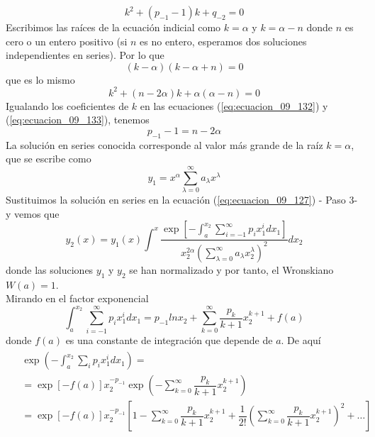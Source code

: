 \begin{equation}
k^{2} + (p_{-1} - 1) k + q_{-2} = 0
\label{eq:ecuacion_09_132}
\end{equation}
Escribimos las raíces de la ecuación indicial como $k = \alpha$ y $k= \alpha -n$ donde $n$ es cero o un entero positivo (si $n$ es no entero, esperamos dos soluciones independientes en series). Por lo que
\begin{equation}
(k - \alpha)(k - \alpha + n) = 0
\label{eq:ecuacion_09_133}
\end{equation}
que es lo mismo
\[ k^{2} + (n - 2 \alpha)k + \alpha(\alpha - n) = 0\]
Igualando los coeficientes de $k$ en las ecuaciones (\ref{eq:ecuacion_09_132}) y (\ref{eq:ecuacion_09_133}), tenemos
\begin{equation}
p_{-1} -1 = n - 2 \alpha
\label{eq:ecuacion_09_134}
\end{equation}
La solución en series conocida corresponde al valor más grande de la raíz $k=\alpha$, que se escribe como
\[ y_{1} =  x^{\alpha} \sum_{\lambda=0}^{\infty} a_{\lambda} x^{\lambda} \]
Sustituimos la solución en series en la ecuación (\ref{eq:ecuacion_09_127}) - Paso 3- y vemos que
\begin{equation}
y_{2}(x) = y_{1} (x) \int^{x} \dfrac{\exp \left[ - \int_{a}^{x_{2}} \sum_{i=-1}^{\infty} p_{i} x^{i}_{1} d x_{1} \right] }{x_{2}^{2\alpha} \left( \sum_{\lambda=0}^\infty a_{\lambda} x_{2}^{\lambda} \right)^{2} } dx_{2}
\label{eq:ecuacion_09_135}
\end{equation}
donde las soluciones $y_{1}$ y $y_{2}$ se han normalizado y por tanto, el Wronskiano $W(a)=1$. 
\\
Mirando en el factor exponencial
\begin{equation}
\int_{a}^{x_{2}} \sum_{i=-1}^{\infty} p_{i} x_{1}^{i} dx_{1} = p_{-1} ln x_{2} + \sum_{k=0}^{\infty} \dfrac{p_{k}}{k+1} x_{2}^{k+1} + f(a)
\label{eq:ecuacion_09_136}
\end{equation}
donde $f(a)$ es una constante de integración que depende de $a$. De aquí
\begin{eqnarray}
\begin{aligned}
&{}\exp \left( - \int_{a}^{x_{2}} \sum_{i} p_{i} x_{1}^{i} dx_{1} \right) =  \\
&= \exp [ - f(a) ] x_{2}^{-p_{-1}} \exp \left( - \sum_{k=0}^{\infty} \dfrac{p_{k}}{k+1} x_{2}^{k+1} \right)  \\
&= \exp [ - f(a) ] x_{2}^{-p_{-1}} \left[ 1 - \sum_{k=0}^{\infty} \dfrac{p_{k}}{k+1} x_{2}^{k+1} + \dfrac{1}{2!} \left( \sum_{k=0}^{\infty} \dfrac{p_{k}}{k+1} x_{2}^{k+1} \right)^{2} + \ldots \right]
\end{aligned}
\label{eq:ecuacion_09_137}
\end{eqnarray}
